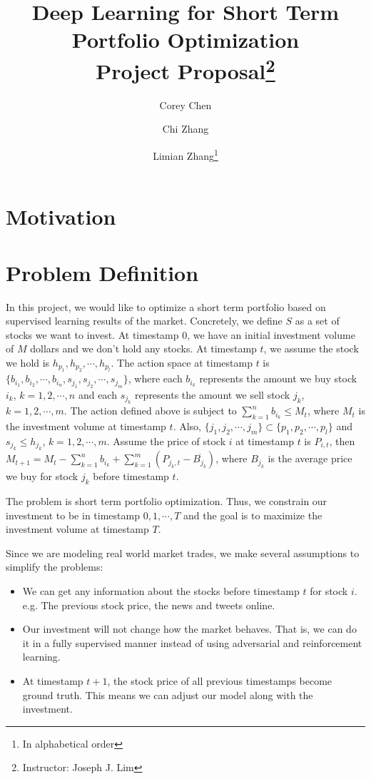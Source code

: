 \documentclass[a4paper, 11pt]{article}
\title{\textbf{Deep Learning for Short Term Portfolio Optimization}\\Project Proposal\thanks{Instructor: Joseph J. Lim}}
\author[]{Corey Chen}
\author[]{Chi Zhang}
\author[]{Limian Zhang\footnote{In alphabetical order}}
\affil[]{Department of Computer Science}
\begin{document}
  \maketitle                     %
  \begin{spacing}{1}
    \section{Motivation}
    
    \section{Problem Definition}
    In this project, we would like to optimize a short term portfolio based on supervised learning results of the market. Concretely, we define $S$ as a set of stocks we want to invest. At timestamp 0, we have an initial investment volume of $M$ dollars and we don't hold any stocks. At timestamp $t$, we assume the stock we hold is $h_{p_1}, h_{p_2}, \cdots, h_{p_l}$. The action space at timestamp $t$ is $\{b_{i_1}, b_{i_2},\cdots, b_{i_n}, s_{j_1}, s_{j_2}, \cdots, s_{j_m}\}$, where each $b_{i_k}$ represents the amount we buy stock $i_k$, $k=1, 2, \cdots, n$ and each $s_{j_k}$ represents the amount we sell stock $j_k$, $k=1, 2, \cdots, m$. The action defined above is subject to $\sum_{k=1}^{n}b_{i_k}\leq M_t$, where $M_t$ is the investment volume at timestamp $t$. Also, $\{j_1, j_2, \cdots, j_m\}\subset\{p_1, p_2, \cdots, p_l\}$ and $s_{j_k}\leq h_{j_k}$, $k=1, 2, \cdots, m$. Assume the price of stock $i$ at timestamp $t$ is $P_{i, t}$, then $M_{t+1} = M_{t} - \sum_{k=1}^{n}b_{i_k} + \sum_{k=1}^{m}(P_{j_k, t} - \overline{B_{j_k}})$, where $B_{j_k}$ is the average price we buy for stock $j_k$ before timestamp $t$. 
    
    The problem is short term portfolio optimization. Thus, we constrain our investment to be in timestamp $0, 1, \cdots, T$ and the goal is to maximize the investment volume at timestamp $T$.
    
    Since we are modeling real world market trades, we make several assumptions to simplify the problems:
    \begin{itemize}
      \item We can get any information about the stocks before timestamp $t$ for stock $i$. e.g. The previous stock price, the news and tweets online.
      \item Our investment will not change how the market behaves. That is, we can do it in a fully supervised manner instead of using adversarial and reinforcement learning.
      \item At timestamp $t+1$, the stock price of all previous timestamps become ground truth. This means we can adjust our model along with the investment.
    \end{itemize}
    

\end{spacing}
\end{document}
